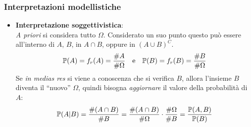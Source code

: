 \subsubsection{Interpretazioni modellistiche}
\begin{itemize}
  \item \textbf{Interpretazione soggettivistica}: \\
  \textit{A priori} si considera tutto $\Omega$. Considerato un suo punto questo può essere all'interno di $A$, $B$, in $A \cap B$, oppure in $(A \cup B)^C$.
  $$  \mathbb P(A) = f_r(A) = \frac{\#A}{\#\Omega}  \quad \text{e} \quad
  \mathbb P(B) = f_r(B) = \frac{\#B}{\#\Omega}$$
  Se \textit{in medias res} si viene a conoscenza che si verifica $B$, allora l'insieme $B$ diventa il ``nuovo'' $\Omega$, quindi bisogna \emph{aggiornare} il valore della probabilità di $A$:
  $$
  \mathbb P(A|B) = \frac{\#(A \cap B)}{\#B} = \frac{\#(A \cap B)}{\#\Omega} \cdot \frac{\#\Omega}{\#B} = \frac{\mathbb P(A,B)}{\mathbb P(B)}
  $$
  \begin{figure}[H]
    \centering
    \def\firstcircle{(0,0) circle (1.2cm)}
    \def\secondcircle{(-35:1.5cm) circle (1.2cm)}
    \def\drect {(-1.5,-2.5) rectangle (3,1.5)}
\end{figure}
\end{itemize}
